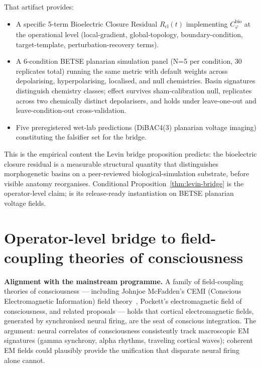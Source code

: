 \documentclass[11pt]{article}
\theoremstyle{plain}
\theoremstyle{definition}
\theoremstyle{remark}
\newcommand{\Cph}{C_\varphi}
\begin{document}
That artifact provides:

\begin{itemize}[leftmargin=2em]
\item A specific 5-term Bioelectric Closure Residual $R_{\mathrm{cl}}(t)$ implementing $\Cph^{\mathrm{bio}}$ at the operational level (local-gradient, global-topology, boundary-condition, target-template, perturbation-recovery terms).
\item A 6-condition BETSE planarian simulation panel (N=5 per condition, 30 replicates total) running the same metric with default weights across depolarising, hyperpolarising, localised, and null chemistries. Basin signatures distinguish chemistry classes; effect survives sham-calibration null, replicates across two chemically distinct depolarisers, and holds under leave-one-out and leave-condition-out cross-validation.
\item Five preregistered wet-lab predictions (DiBAC4(3) planarian voltage imaging) constituting the falsifier set for the bridge.
\end{itemize}

This is the empirical content the Levin bridge proposition predicts: the bioelectric closure residual is a measurable structural quantity that distinguishes morphogenetic basins on a peer-reviewed biological-simulation substrate, before visible anatomy reorganises. Conditional Proposition~\ref{thm:levin-bridge} is the operator-level claim; \citet{SolutionLab001} is its release-ready instantiation on BETSE planarian voltage fields.

\section{Operator-level bridge to field-coupling theories of consciousness}\label{sec:cemi}

\textbf{Alignment with the mainstream programme.} A family of field-coupling theories of consciousness --- including Johnjoe McFadden's CEMI (Conscious Electromagnetic Information) field theory~\citep{McFaddenCEMI}, Pockett's electromagnetic field of consciousness, and related proposals --- holds that cortical electromagnetic fields, generated by synchronised neural firing, are the seat of conscious integration. The argument: neural correlates of consciousness consistently track macroscopic EM signatures (gamma synchrony, alpha rhythms, traveling cortical waves); coherent EM fields could plausibly provide the unification that disparate neural firing alone cannot.
\end{document}
